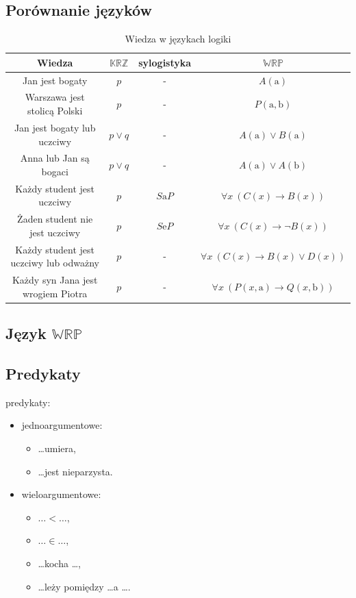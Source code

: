 \documentclass[12pt]{article}
\newcommand {\KRZ} {\ensuremath{\mathbb{KRZ}}}
\newcommand {\WRP} {\ensuremath{\mathbb{WRP}}}
\begin{document}
\subsection{Porównanie języków}
\begin{table}[p]
\begin{center}
{\scriptsize
\begin{tabular}{|c||c|c|c|}
\hline
\textbf{Wiedza} & \KRZ & \textbf{sylogistyka} & \WRP \\
\hline
Jan jest bogaty & $p$ & - & $A(\textrm{a})$ \\
\hline
Warszawa jest stolicą Polski & $p$ & - & $P(\textrm{a}, \textrm{b})$\\
\hline
Jan jest bogaty lub uczciwy & $p \lor q$ & - & $A(\textrm{a}) \lor B(\textrm{a})$\\
\hline
Anna lub Jan są bogaci & $p \lor q$ & - & $A(\textrm{a}) \lor A(\textrm{b})$\\
\hline
Każdy student jest uczciwy & $p$ & $S\textrm{a}P$ & $\forall x~(C(x) \to B(x))$ \\
\hline
Żaden student nie jest uczciwy & $p$ & $S\textrm{e}P$ & $\forall x~(C(x) \to \neg B(x))$ \\
\hline
Każdy student jest uczciwy lub odważny & $p$ & - & $\forall x~(C(x) \to B(x) \lor D(x))$ \\
\hline
Każdy syn Jana jest wrogiem Piotra & $p$ & - & $\forall x~(P(x,\textrm{a}) \to Q(x,\textrm{b}))$ \\
\hline
\end{tabular}
}
\caption{Wiedza w językach logiki}
\label{Comparison}

\end{center}

\end{table}
%

\subsection{Język \WRP}

\subsection{Predykaty}
predykaty:
%
\begin{itemize}
\item jednoargumentowe:
\begin{itemize}
\item \dots umiera,
\item \dots jest nieparzysta.
\end{itemize}
%
\item wieloargumentowe:
\begin{itemize}
\item $\dots < \dots$,
\item $\dots \in \dots$,
%
\item \dots kocha \dots,
%
\item \dots leży pomiędzy \dots a \dots.
\end{itemize}
\end{itemize}
%
\end{document}
